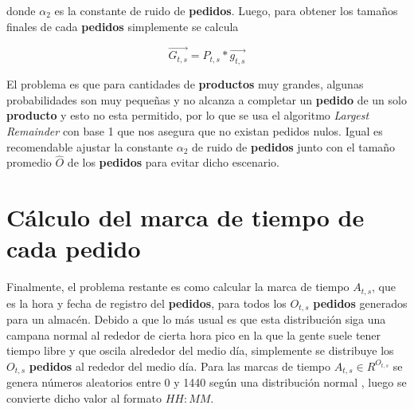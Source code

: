 donde $\alpha_2$ es la constante de ruido de \textbf{pedidos}. Luego, para obtener los tamaños finales de cada \textbf{pedidos} simplemente se calcula

\begin{equation}
    \label{eq:products_by_storage}
    \overrightarrow{G_{t,s}}  = P_{t,s} * \overrightarrow{g_{t,s} }
\end{equation}

El problema es que para cantidades de \textbf{productos} muy grandes, algunas probabilidades son muy pequeñas y no alcanza a completar un \textbf{pedido} de un solo \textbf{producto} y esto no esta permitido, por lo que se usa el algoritmo \textit{Largest Remainder} con base 1 que nos asegura que no existan pedidos nulos. Igual es recomendable ajustar la constante $\alpha_2$ de ruido de \textbf{pedidos} junto con el tamaño promedio $\widehat{O}$ de los \textbf{pedidos} para evitar dicho escenario.

\section{Cálculo del marca de tiempo de cada pedido}
Finalmente, el problema restante es como calcular la marca de tiempo $A_{t,s}$, que es la hora y fecha de registro del \textbf{pedidos}, para todos los $O_{t,s}$ \textbf{pedidos} generados para un almacén. Debido a que lo más usual es que esta distribución siga una campana normal al rededor de cierta hora pico en la que la gente suele tener tiempo libre y que oscila alrededor del medio día, simplemente se distribuye los $O_{t,s}$ \textbf{pedidos} al rededor del medio día. Para las marcas de tiempo $A_{t,s} \in R^{O_{t,s}}$ se genera números aleatorios entre 0 y 1440 según una distribución normal , luego se convierte dicho valor al formato $HH:MM$.
